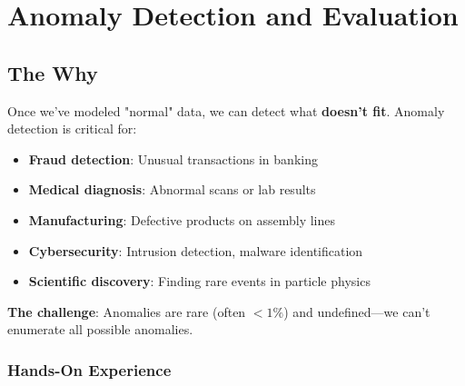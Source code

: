 
\chapter{Anomaly Detection and Evaluation}


\section{The Why}


Once we've modeled "normal" data, we can detect what \textbf{doesn't fit}. Anomaly detection is critical for:
\begin{itemize}
    \item \textbf{Fraud detection}: Unusual transactions in banking
    \item \textbf{Medical diagnosis}: Abnormal scans or lab results
    \item \textbf{Manufacturing}: Defective products on assembly lines
    \item \textbf{Cybersecurity}: Intrusion detection, malware identification
    \item \textbf{Scientific discovery}: Finding rare events in particle physics
\end{itemize}

\textbf{The challenge}: Anomalies are rare (often $<1\%$) and undefined---we can't enumerate all possible anomalies.

\subsection{Hands-On Experience}


